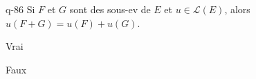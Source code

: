 \begin{truefalse}{q-86}
Si $F$ et $G$ sont des sous-ev de $E$ et $u \in \mathcal L(E)$, alors $u(F+G)=u(F)+u(G)$.
\item* Vrai
\item Faux
\end{truefalse}

